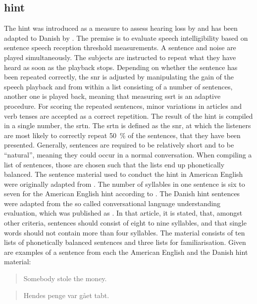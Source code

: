 \subsection{\gls{hint}}\label{ssec:hint}
The \gls{hint} was introduced as a measure to assess hearing loss by \citep{nilsson_95} and has been adapted to Danish by \citep{hint_2011}.
The premise is to evaluate speech intelligibility based on sentence speech reception threshold measurements. 
A sentence and noise are played simultaneously. The subjects are instructed to repeat what they have heard as soon as the playback stops. 
Depending on whether the sentence has been repeated correctly, the \gls{snr} is adjusted by manipulating the gain of the speech playback and from within a list consisting of a number of sentences, another one is played back, meaning that measuring \gls{ssrt} is an adaptive procedure.
For scoring the repeated sentences, minor variations in articles and verb tenses are accepted as a correct repetition.
The result of the \gls{hint} is compiled in a single number, the \gls{srtn}.
The \gls{srtn} is defined as the \gls{snr}, at which the listeners are most likely to correctly repeat \SI{50}{\percent} of the sentences, that they have been presented.
Generally, sentences are required to be relatively short and to be \enquote{natural}, meaning they could occur in a normal conversation.
When compiling a list of sentences, those are chosen such that the lists end up phonetically balanced. 
The sentence material used to conduct the \gls{hint} in American English were originally adapted from \citep{bench_bamford_79}.
The number of syllables in one sentence is six to seven for the American English \gls{hint} according to \citep{nilsson_95}.
The Danish \gls{hint} sentences were adapted from the so called conversational language understanding evaluation, which was published as \citep{nielsen_dau_09}. In that article, it is stated, that, amongst other criteria, sentences should consist of eight to nine syllables, and that single words should not contain more than four syllables.
The material consists of ten lists of phonetically balanced sentences and three lists for familiarisation.
Given are examples of a sentence from each the American English and the Danish \gls{hint} material:
\begin{quote}
Somebody stole the money.
\end{quote}
\begin{quote}
Hendes penge var gået tabt.
\end{quote}

